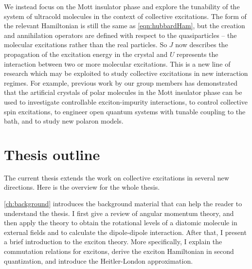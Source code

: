 We instead focus on the Mott insulator phase and explore the tunability of the system of ultracold molecules in the 
context of collective excitations. The form of the relevant Hamiltonian is still the same as \autoref{eqn:hubbardHam}, but the creation
and annihilation operators are defined with respect to the quasiparticles -- the molecular excitations rather than the real 
particles.  So $J$ now describes the propagation of the excitation energy in the crystal and $U$ represents the interaction
between two or more molecular excitations. This is a new line of research which may be exploited to study collective 
excitations in new interaction regimes. For example, previous work by our group members has demonstrated
that the artificial crystals of polar molecules in the Mott insulator phase can be used to investigate controllable exciton-impurity interactions\cite{felipe},
to control collective spin excitations\cite{perez-rios2010}, to engineer open quantum systems with tunable coupling to the bath\cite{felipe-polarons}, and to study new polaron models\cite{felipe-arxive-polaron}. 


\section{Thesis outline}
\label{sec:outline}

The current thesis extends the work on collective excitations in several new directions. Here is the overview for the whole thesis.

\autoref{ch:background} introduces the background material that can help the reader to understand 
the thesis. I first give a review of angular momentum theory,  and then apply the theory to obtain the rotational levels of a diatomic molecule in external fields and to calculate the dipole-dipole interaction. After that, I present a brief introduction to the exciton theory. More 
specifically, I explain the commutation relations for excitons, derive the exciton Hamiltonian in second quantization, and introduce the Heitler-London approximation.  

